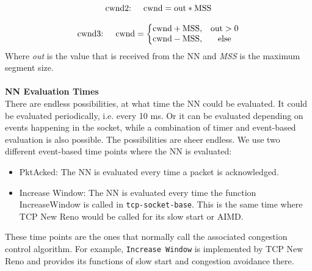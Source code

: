 \begin{equation}\label{eq:direct}
\text{cwnd2: \quad} \text{cwnd} = \text{out} * \text{MSS}	
\end{equation}

\begin{equation}\label{eq:sigAdd}
\text{cwnd3: \quad} \text{cwnd} = \left\{\begin{matrix}
\text{cwnd} + \text{MSS}, & \text{out} > 0\\ 
\text{cwnd} - \text{MSS}, & \text{else}
\end{matrix}\right.
\end{equation}
Where \textit{out} is the value that is received from the NN and \textit{MSS} is the maximum segment size.\\\\

\textbf{NN Evaluation Times}\\
There are endless possibilities, at what time the NN could be evaluated. It could be evaluated periodically, i.e. every 10 ms. Or it can be evaluated depending on events happening in the socket, while a combination of timer and event-based evaluation is also possible. The possibilities are sheer endless. 
We use two different event-based time points where the NN is evaluated:
\begin{itemize}
	\item{PktAcked: The NN is evaluated every time a packet is acknowledged.}
	\item{Increase Window: The NN is evaluated every time the function IncreaseWindow is called in \texttt{tcp-socket-base}. This is the same time where TCP New Reno would be called for its slow start or AIMD.}
\end{itemize}
These time points are the ones that normally call the associated congestion control algorithm. For example, \texttt{Increase Window} is implemented by TCP New Reno and provides its functions of slow start and congestion avoidance there. 

